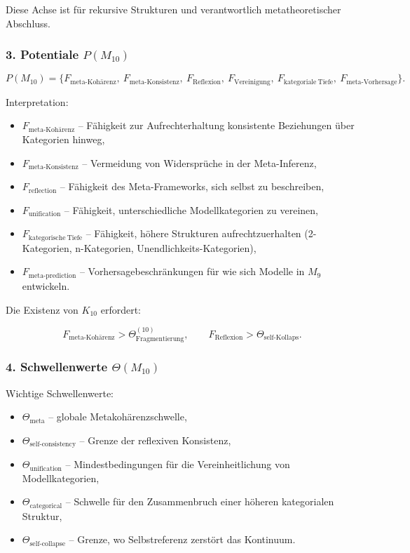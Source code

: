 Diese Achse ist für rekursive Strukturen und verantwortlich
metatheoretischer Abschluss.

\subsubsection*{3. Potentiale $P(M_{10})$}

\[
P(M_{10}) =
\{
F_{\mathrm{meta\mbox{-}Kohärenz}},\
F_{\mathrm{meta\mbox{-}Konsistenz}},\
F_{\mathrm{Reflexion}},\
F_{\mathrm{Vereinigung}},\
F_{\mathrm{kategoriale\ Tiefe}},\
F_{\mathrm{meta\mbox{-}Vorhersage}}
\}.
\]

Interpretation:

\begin{itemize}
    \item $F_{\mathrm{meta\mbox{-}Kohärenz}}$ – Fähigkeit zur Aufrechterhaltung
        konsistente Beziehungen über Kategorien hinweg,
    \item $F_{\mathrm{meta\mbox{-}Konsistenz}}$ – Vermeidung von
        Widersprüche in der Meta-Inferenz,
    \item $F_{\mathrm{reflection}}$ – Fähigkeit des Meta-Frameworks, sich selbst zu beschreiben,
    \item $F_{\mathrm{unification}}$ – Fähigkeit, unterschiedliche Modellkategorien zu vereinen,
    \item $F_{\mathrm{kategorische\ Tiefe}}$ – Fähigkeit, höhere Strukturen aufrechtzuerhalten
        (2-Kategorien, n-Kategorien, Unendlichkeits-Kategorien),
    \item $F_{\mathrm{meta\mbox{-}prediction}}$ – Vorhersagebeschränkungen für
        wie sich Modelle in $M_9$ entwickeln.
\end{itemize}

Die Existenz von $K_{10}$ erfordert:

\[
F_{\mathrm{meta\mbox{-}Kohärenz}}>\Theta_{\mathrm{Fragmentierung}}^{(10)},
\qquad
F_{\mathrm{Reflexion}}>\Theta_{\mathrm{self\mbox{-}Kollaps}}.
\]

\subsubsection*{4. Schwellenwerte $\Theta(M_{10})$}

Wichtige Schwellenwerte:

\begin{itemize}
    \item $\Theta_{\mathrm{meta}}$ – globale Metakohärenzschwelle,
    \item $\Theta_{\mathrm{self\mbox{-}consistency}}$ – Grenze der reflexiven Konsistenz,
    \item $\Theta_{\mathrm{unification}}$ – Mindestbedingungen für die Vereinheitlichung von Modellkategorien,
    \item $\Theta_{\mathrm{categorical}}$ – Schwelle für den Zusammenbruch einer höheren kategorialen Struktur,
    \item $\Theta_{\mathrm{self\mbox{-}collapse}}$ – Grenze, wo Selbstreferenz
        zerstört das Kontinuum.
\end{itemize}

